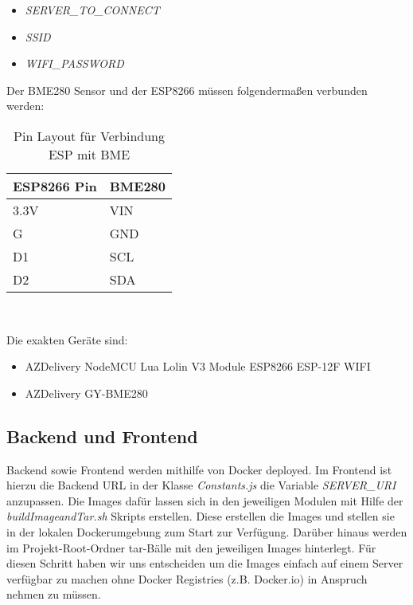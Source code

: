 \begin{itemize}
	\item \textit{SERVER\_TO\_CONNECT}
	\item \textit{SSID}
	\item \textit{WIFI\_PASSWORD}
\end{itemize}

Der BME280 Sensor und der ESP8266 müssen folgendermaßen verbunden werden:

\begin{table}[hbt]
	\centering
	\begin{minipage}[t]{.5\textwidth}
		\caption{Pin Layout für Verbindung ESP mit BME}
	\begin{tabular}{|l|l|}
		\hline
		\textbf{ESP8266 Pin}	& \textbf{BME280}  \\
		\hline
		3.3V & VIN \\
		\hline
		G & GND \\
		\hline
		D1 & SCL \\
		\hline
		D2 & SDA \\
		\hline
	\end{tabular}
	\\
\label{tab:espBmePinout}
\end{minipage}
\end{table}

Die exakten Geräte sind:

\begin{itemize}
    \item AZDelivery NodeMCU Lua Lolin V3 Module ESP8266 ESP-12F WIFI
    \item AZDelivery GY-BME280
\end{itemize}

\subsection{Backend und Frontend}

Backend sowie Frontend werden mithilfe von Docker deployed.
Im Frontend ist hierzu die Backend URL in der Klasse \textit{Constants.js} die Variable \textit{SERVER\_URI} anzupassen.
Die Images dafür lassen sich in den jeweiligen Modulen mit Hilfe der \textit{buildImageandTar.sh} Skripts erstellen.
Diese erstellen die Images und stellen sie in der lokalen Dockerumgebung zum Start zur Verfügung.
Darüber hinaus werden im Projekt-Root-Ordner tar-Bälle mit den jeweiligen Images hinterlegt.
Für diesen Schritt haben wir uns entscheiden um die Images einfach auf einem Server verfügbar zu machen ohne Docker Registries (z.B. Docker.io) in Anspruch nehmen zu müssen.

